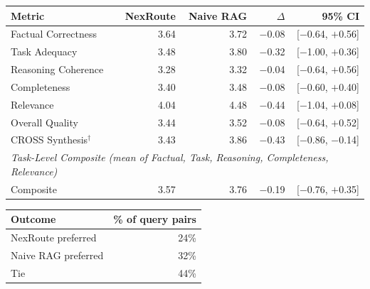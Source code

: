\documentclass[a4paper,fleql,doubleblind]{cas-sc}
\begin{document}
\vspace{4pt}
\begin{center}
\begingroup
\renewcommand{\arraystretch}{1.2}
\label{tab:multijudge}
\small
\setlength{\tabcolsep}{4pt}
\begin{tabular}{lrrrr}
\toprule
\textbf{Metric} & \textbf{NexRoute} & \textbf{Naive RAG} & \textbf{$\Delta$} & \textbf{95\% CI} \\
\midrule
Factual Correctness     & 3.64 & 3.72 & $-$0.08 & [$-$0.64, $+$0.56] \\
Task Adequacy           & 3.48 & 3.80 & $-$0.32 & [$-$1.00, $+$0.36] \\
Reasoning Coherence     & 3.28 & 3.32 & $-$0.04 & [$-$0.64, $+$0.56] \\
Completeness            & 3.40 & 3.48 & $-$0.08 & [$-$0.60, $+$0.40] \\
Relevance               & 4.04 & 4.48 & $-$0.44 & [$-$1.04, $+$0.08] \\
Overall Quality         & 3.44 & 3.52 & $-$0.08 & [$-$0.64, $+$0.52] \\
\midrule
CROSS Synthesis$^\dagger$ & 3.43 & 3.86 & $-$0.43 & [$-$0.86, $-$0.14] \\
\midrule
\multicolumn{5}{l}{\textit{Task-Level Composite (mean of Factual, Task, Reasoning, Completeness, Relevance)}} \\
Composite               & 3.57 & 3.76 & $-$0.19 & [$-$0.76, $+$0.35] \\
\bottomrule
\end{tabular}
\endgroup
\end{center}
\vspace{4pt}

\vspace{4pt}
\begin{center}
\begingroup
\renewcommand{\arraystretch}{1.2}
\label{tab:judge_pref}
\small
\begin{tabular}{lr}
\toprule
\textbf{Outcome} & \textbf{\% of query pairs} \\
\midrule
NexRoute preferred  & 24\% \\
Naive RAG preferred & 32\% \\
Tie                 & 44\% \\
\bottomrule
\end{tabular}
\endgroup
\end{center}
\vspace{4pt}
\end{document}
